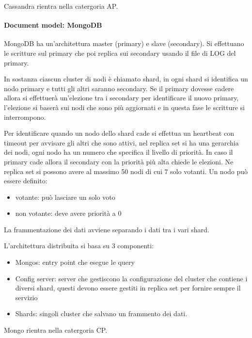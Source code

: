 Cassandra rientra nella catergoria AP.
\paragraph{Document model: MongoDB}
MongoDB ha un'architettura master (primary) e slave (secondary). 
Si effettuano le scritture sul primary che poi replica sui secondary usando il 
file di LOG del primary.

In sostanza ciascun cluster di nodi è chiamato shard, in ogni shard si identifica un nodo primary 
e tutti gli altri saranno secondary. Se il primary dovesse cadere allora si effettuerà
un'elezione tra i secondary per identificare il nuovo primary, l'elezione si 
baserà sui nodi che sono più aggiornati e in questa fase le scritture si interrompono.

Per identificare quando un nodo dello shard cade si effettua un heartbeat con timeout
per avvisare gli altri che sono attivi, nel replica set si ha una gerarchia dei 
nodi, ogni nodo ha un numero che specifica il livello di priorità. In caso il 
primary cade allora il secondary con la priorità più alta chiede le elezioni. 
Ne replica set si possono avere al massimo 50 nodi di cui $7$ solo votanti.
Un nodo può essere definito:
\begin{itemize}
      \item votante: può lasciare un solo voto
      \item non votante: deve avere priorità a $0$
\end{itemize}

La frammentazione dei dati avviene separando i dati tra i vari shard. 

L'architettura distribuita si basa su 3 componenti:
\begin{itemize}
      \item Mongos: entry point che esegue le query
      \item Config server: server che gestiscono la configurazione del cluster che
      contiene i diversi shard, questi devono essere gestiti in replica set per 
      fornire sempre il servizio
      \item Shards: singoli cluster che salvano un frammento dei dati.
\end{itemize}


Mongo rientra nella catergoria CP.
